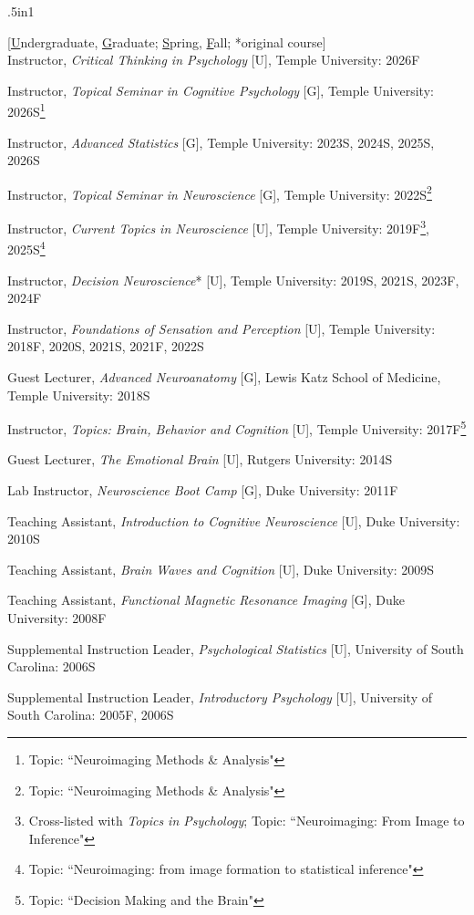 \documentclass[11pt, letterpaper]{article}
\begin{document}
\begin{hangparas}{.5in}{1}

[\underline{U}ndergraduate, \underline{G}raduate; \underline{S}pring, \underline{F}all; *original course]  \\

Instructor, \textit{Critical Thinking in Psychology} [U], Temple University: 2026F

Instructor, \textit{Topical Seminar in Cognitive Psychology} [G], Temple University: 2026S\footnote{Topic: ``Neuroimaging Methods \& Analysis"}

Instructor, \textit{Advanced Statistics} [G], Temple University: 2023S, 2024S, 2025S, 2026S

Instructor, \textit{Topical Seminar in Neuroscience} [G], Temple University: 2022S\footnote{Topic: ``Neuroimaging Methods \& Analysis"}

Instructor, \textit{Current Topics in Neuroscience} [U], Temple University: 2019F\footnote{Cross-listed with \textit{Topics in Psychology}; Topic: ``Neuroimaging: From Image to Inference"}, 2025S\footnote{Topic: ``Neuroimaging: from image formation to statistical inference"}

Instructor, \textit{Decision Neuroscience}* [U], Temple University: 2019S, 2021S, 2023F, 2024F

Instructor, \textit{Foundations of Sensation and Perception} [U], Temple University: 2018F, 2020S, 2021S, 2021F, 2022S

Guest Lecturer, \textit{Advanced Neuroanatomy} [G], Lewis Katz School of Medicine, Temple University: 2018S

Instructor, \textit{Topics: Brain, Behavior and Cognition} [U], Temple University: 2017F\footnote{Topic: ``Decision Making and the Brain"}

Guest Lecturer, \textit{The Emotional Brain} [U], Rutgers University: 2014S

Lab Instructor, \textit{Neuroscience Boot Camp} [G], Duke University: 2011F

Teaching Assistant, \textit{Introduction to Cognitive Neuroscience} [U], Duke University: 2010S

Teaching Assistant, \textit{Brain Waves and Cognition} [U], Duke University: 2009S

Teaching Assistant, \textit{Functional Magnetic Resonance Imaging} [G], Duke University: 2008F

Supplemental Instruction Leader, \textit{Psychological Statistics} [U], University of South Carolina: 2006S

Supplemental Instruction Leader, \textit{Introductory Psychology} [U], University of South Carolina: 2005F, 2006S \\

\end{hangparas}
\end{document}
